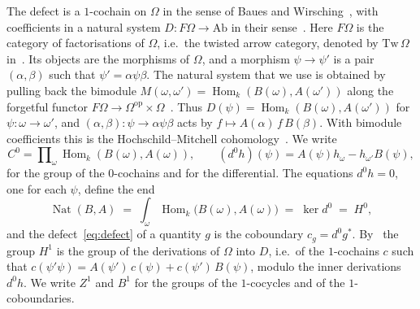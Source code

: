 \documentclass[11pt,a4paper]{article}
\theoremstyle{plain}
\theoremstyle{definition}
\theoremstyle{remark}
\newcommand{\cat}[1]{\mathsf{#1}}
\newcommand{\catO}{\cat{\Omega}}
\newcommand{\op}{\mathrm{op}}
\DeclareMathOperator{\Nat}{Nat}
\DeclareMathOperator{\Hom}{Hom}
\begin{document}
The defect is a $1$-cochain on $\catO$ in the sense of Baues and
Wirsching~\cite[(1.4)]{baues_cohomology_1985}, with coefficients in a natural
system $D \colon F\catO \to \mathrm{Ab}$ in their
sense~\cite[(1.2)]{baues_cohomology_1985}. Here $F\catO$ is the category of
factorisations of $\catO$, i.e.\ the twisted arrow category, denoted by
$\mathrm{Tw}\,\catO$ in~\cite{caputi_diagrammatic_2025}. Its objects are the
morphisms of $\catO$, and a morphism $\psi \to \psi'$ is a pair
$(\alpha,\beta)$ such that $\psi' = \alpha\psi\beta$. The natural system that
we use is obtained by pulling back the bimodule
$M(\omega,\omega') = \Hom_k(B(\omega),A(\omega'))$ along the forgetful functor
$F\catO \to \catO^{\op} \times \catO$~\cite[(1.16)--(1.18)]{baues_cohomology_1985}.
Thus $D(\psi) = \Hom_k(B(\omega),A(\omega'))$ for
$\psi \colon \omega \to \omega'$, and
$(\alpha,\beta) \colon \psi \to \alpha\psi\beta$ acts by
$f \mapsto A(\alpha)\,f\,B(\beta)$. With bimodule coefficients this is the
Hochschild--Mitchell cohomology~\cite[(8.5)]{baues_cohomology_1985}. We write
\[
C^{0} = \prod\nolimits_\omega \Hom_k(B(\omega),A(\omega)),
\qquad
(d^{0}h)(\psi) = A(\psi)h_\omega - h_{\omega'}B(\psi),
\]
for the group of the $0$-cochains and for the differential. The equations
$d^{0}h = 0$, one for each $\psi$, define the
end~\cite[IX.5]{maclane_categories_1998}
\begin{equation}\label{eq:H0}
\Nat(B,A) \;=\; \int_{\omega} \Hom_k\bigl(B(\omega),A(\omega)\bigr)
\;=\; \ker d^{0} \;=\; H^{0},
\end{equation}
and the defect~\eqref{eq:defect} of a quantity $g$ is the coboundary
$c_g = d^{0}g^{*}$. By~\cite[(5.3)--(5.6)]{baues_cohomology_1985} the group
$H^{1}$ is the group of the derivations of $\catO$ into $D$, i.e.\ of the
$1$-cochains $c$ such that
$c(\psi'\psi) = A(\psi')\,c(\psi) + c(\psi')\,B(\psi)$, modulo the inner
derivations $d^{0}h$. We write $Z^{1}$ and $B^{1}$ for the groups of the
$1$-cocycles and of the $1$-coboundaries.
\end{document}

